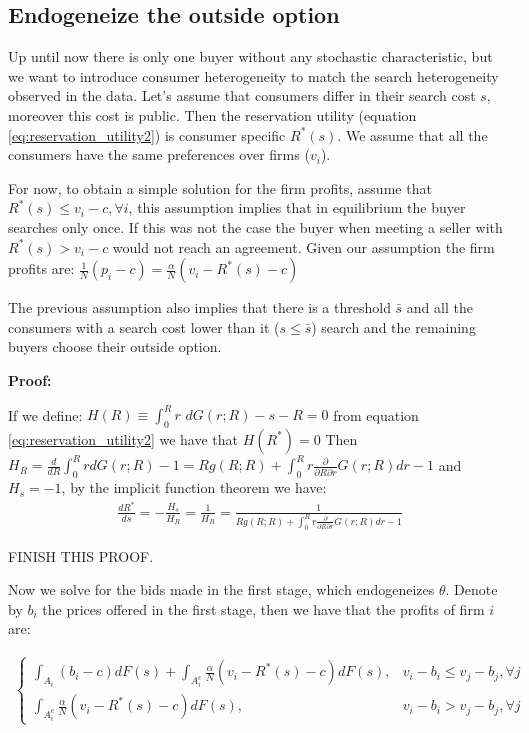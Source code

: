 \documentclass[12pt]{article}
\theoremstyle{plain}
\theoremstyle{plain}
\begin{document}
\subsection{Endogeneize the outside option}

Up until now there is only one buyer without any stochastic characteristic, but we want to introduce consumer heterogeneity to match the search heterogeneity observed in the data. Let's assume that consumers differ in their search cost $s$, moreover this cost is public. Then the reservation utility (equation \ref{eq:reservation_utility2}) is consumer specific $R^*(s)$. We assume that all the consumers have the same preferences over firms ($v_i$). 

For now, to obtain a simple solution for the firm profits, assume that $R^*(s) \leq v_i-c, \forall i$, this assumption implies that in equilibrium the buyer searches only once. If this was not the case the buyer when meeting a seller with $R^*(s) > v_i-c$ would not reach an agreement. Given our assumption the firm profits are: 
$\frac{1}{N} (p_i-c) =\frac{\alpha}{N} ( v_i - R^*(s)- c)$

The previous assumption also implies that there is a threshold $\bar{s}$ and all the consumers with a search cost lower than it ($s\leq\bar{s}$) search and the remaining buyers choose their outside option. 

\textbf{Proof:}

If we define: $H(R)\equiv  \int_0^{R} r \, \, dG(r; R) -s - R = 0 $ from equation \ref{eq:reservation_utility2} we have that $H({R^*}) =0$
Then $H_R = \frac{d}{dR} \int_0^R r dG(r;R) -1= R g(R;R)+\int_0^R r \frac{\partial }{\partial R \partial r}G(r;R) dr-1$ and $H_s = -1$, by the implicit function theorem we have:
\begin{align*}
    \frac{dR^*}{ds}= - \frac{H_s}{H_R} = \frac{1}{H_R} = \frac{1}{ R g(R;R)+\int_0^R r \frac{\partial }{\partial R \partial r}G(r;R) dr-1}
\end{align*}

FINISH THIS PROOF. 

\vspace{2cm}


Now we solve for the bids made in the first stage, which endogeneizes $\theta$. Denote by $b_i$ the prices offered in the first stage, then we have that the profits of firm $i$ are: 

\begin{align*}
\begin{cases}
           \int_{A_i} (b_i-c) dF(s) + \int_{A_i^c} \frac{\alpha}{N} ( v_i - R^*(s)- c) dF(s), & v_i - b_i \leq v_j - b_j, \forall j \\
           \int_{A_i^c} \frac{\alpha}{N} ( v_i - R^*(s)- c) dF(s) , &  v_i - b_i > v_j - b_j, \forall j
\end{cases}
\end{align*}
\end{document}
